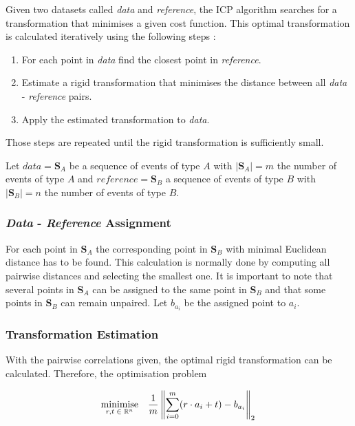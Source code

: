 \documentclass[conference]{IEEEtran}
\theoremstyle{examplestyle}
\begin{document}
Given two datasets called \textit{data} and \textit{reference}, the \ac{ICP} algorithm searches for a transformation that minimises a given cost function. This optimal transformation is calculated iteratively using the following steps \cite{Besl1992}:

\begin{enumerate}
	\item For each point in \textit{data} find the closest point in \textit{reference}.
	\item Estimate a rigid transformation that minimises the distance between all \textit{data} - \textit{reference} pairs.
	\item Apply the estimated transformation to \textit{data}.
\end{enumerate}

Those steps are repeated until the rigid transformation is sufficiently small.

Let \(data = \pmb{S}_A\) be a sequence of events of type \(A\) with \(|\pmb{S}_A| = m\) the number of events of type \(A\) and \(reference = \pmb{S}_B\) a sequence of events of type \(B\) with \(|\pmb{S}_B| = n\) the number of events of type \(B\).

\subsubsection{\textit{Data} - \textit{Reference} Assignment}
For each point in \(\pmb{S}_A\) the corresponding point in \(\pmb{S}_B\) with minimal Euclidean distance has to be found. This calculation is normally done by computing all pairwise distances and selecting the smallest one. It is important to note that several points in \(\pmb{S}_A\) can be assigned to the same point in \(\pmb{S}_B\) and that some points in \(\pmb{S}_B\) can remain unpaired. Let \(b_{a_i}\) be the assigned point to \(a_i\).


\subsubsection{Transformation Estimation}
With the pairwise correlations given, the optimal rigid transformation can be calculated. Therefore, the optimisation problem

\begin{equation} \label{eq:originalICP}
	\underset{ r, t \; \in \; \mathbb{R}^n }{\text{minimise}}	\quad	\dfrac{1}{m} \left\| \sum_{i = 0}^{m} (r \cdot a_i + t) - b_{a_i} \right\|_2 \\
\end{equation}
\end{document}
